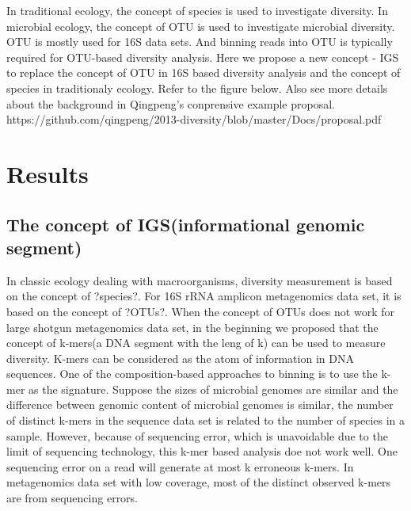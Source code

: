 In traditional ecology, the concept of species is used to investigate diversity. In microbial ecology, the concept of OTU is used to investigate microbial diversity. OTU is mostly used for 16S data sets. And binning reads into OTU is typically required for OTU-based diversity analysis. Here we propose a new concept - IGS to replace the concept of OTU in 16S based diversity analysis and the concept of species in traditionaly ecology. Refer to the figure below. Also see more details about the background in Qingpeng's conprensive example proposal. https://github.com/qingpeng/2013-diversity/blob/master/Docs/proposal.pdf



\section{Results}



\subsection{The concept of IGS(informational genomic segment)}

In classic ecology dealing with macroorganisms, diversity measurement is based on the concept of ?species?. For 16S rRNA amplicon metagenomics data set, it is based on the concept of ?OTUs?. When the concept of OTUs does not work for large shotgun metagenomics data set, in the beginning we proposed that the concept of k-mers(a DNA segment with the leng of k) can be used to measure diversity. K-mers can be considered as the atom of information in DNA sequences. One of the composition-based approaches to binning is to use the k-mer as the signature. Suppose the sizes of microbial genomes are similar and the difference between genomic content of microbial genomes is similar, the number of distinct k-mers in the sequence data set is related to the number of species in a sample. However, because of sequencing error, which is unavoidable due to the limit of sequencing technology, this k-mer based analysis doe not work well. One sequencing error on a read will generate at most k erroneous k-mers. In metagenomics data set with low coverage, most of the distinct observed k-mers are from sequencing errors.



